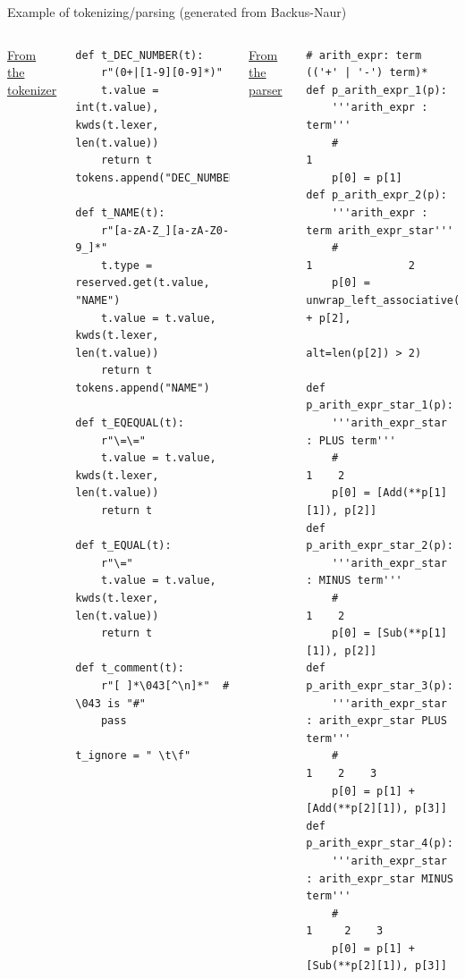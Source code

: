 \documentclass[aspectratio=169]{beamer}
\begin{document}
\begin{frame}[fragile]{Example of tokenizing/parsing (generated from Backus-Naur)}
\vspace{0.25 cm}
\begin{columns}[t]
{\large \underline{From the tokenizer}}

\tiny
\begin{verbatim}
def t_DEC_NUMBER(t):
    r"(0+|[1-9][0-9]*)"
    t.value = int(t.value), kwds(t.lexer, len(t.value))
    return t
tokens.append("DEC_NUMBER")

def t_NAME(t):
    r"[a-zA-Z_][a-zA-Z0-9_]*"
    t.type = reserved.get(t.value, "NAME")
    t.value = t.value, kwds(t.lexer, len(t.value))
    return t
tokens.append("NAME")

def t_EQEQUAL(t):
    r"\=\="
    t.value = t.value, kwds(t.lexer, len(t.value))
    return t

def t_EQUAL(t):
    r"\="
    t.value = t.value, kwds(t.lexer, len(t.value))
    return t

def t_comment(t):
    r"[ ]*\043[^\n]*"  # \043 is "#"
    pass

t_ignore = " \t\f"
\end{verbatim}

{\large \underline{From the parser}}

\tiny
\begin{verbatim}
# arith_expr: term (('+' | '-') term)*
def p_arith_expr_1(p):
    '''arith_expr : term'''
    #                  1
    p[0] = p[1]
def p_arith_expr_2(p):
    '''arith_expr : term arith_expr_star'''
    #                  1               2
    p[0] = unwrap_left_associative([p[1]] + p[2],
                                   alt=len(p[2]) > 2)

def p_arith_expr_star_1(p):
    '''arith_expr_star : PLUS term'''
    #                       1    2
    p[0] = [Add(**p[1][1]), p[2]]
def p_arith_expr_star_2(p):
    '''arith_expr_star : MINUS term'''
    #                        1    2
    p[0] = [Sub(**p[1][1]), p[2]]
def p_arith_expr_star_3(p):
    '''arith_expr_star : arith_expr_star PLUS term'''
    #                                  1    2    3
    p[0] = p[1] + [Add(**p[2][1]), p[3]]
def p_arith_expr_star_4(p):
    '''arith_expr_star : arith_expr_star MINUS term'''
    #                                  1     2    3
    p[0] = p[1] + [Sub(**p[2][1]), p[3]]
\end{verbatim}
\end{columns}
\end{frame}
\end{document}
